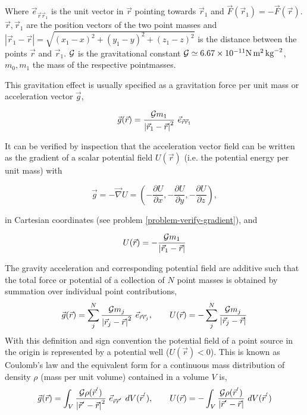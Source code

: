 Where ${\vec e}_{\vec{r}\vec{r}_1}$ is the unit vector in 
${\vec r}$ pointing towards ${\vec r}_1$
and ${\vec F}({\vec r}_1) = - {\vec F}({\vec r})$.
${\vec r}, {\vec r}_1$ 
are the position vectors of the two point masses
and 
$\left | {\vec r}_1 - {\vec r} \right | =
\sqrt{(x_1-x)^2 + (y_1-y)^2 + (z_1-z)^2}$
is the distance between the points ${\vec r}$ and ${\vec r}_1$.
${\cal G}$ is the gravitational constant 
${\cal G} \simeq 6.67 \times 10^{-11} \si{\newton\square\metre\per\square\kilo\gram}$,
$m_0, m_1$ the mass of the respective pointmasses.


This gravitation effect is usually specified as a gravitation force per 
unit mass or acceleration vector ${\vec g}$,
\begin{mdframed}[backgroundcolor=blue!5]
\begin{equation}
{\vec g}({\vec r}) =
\frac{{\cal G} m_1}{\left | {\vec r}_1 - {\vec r} \right | ^2} ~ {\vec e}_{\vec{r}\vec{r}_1} 
\label{grav_accel}
\end{equation}
\end{mdframed}
It can be verified by inspection that the acceleration vector field 
can be written as the 
gradient of a scalar potential field $U({\vec r})$ (i.e. the potential
energy per unit mass) with
\begin{mdframed}[backgroundcolor=blue!5]
\[
{\vec g} = - \vec\nabla U = 
(- \frac{\partial U}{\partial x}, 
 - \frac{\partial U}{\partial y}, 
 - \frac{\partial U}{\partial z}),\]
\end{mdframed}
in Cartesian coordinates (see problem \ref{problem-verify-gradient}),
and
\begin{mdframed}[backgroundcolor=blue!5]
\begin{equation}
U({\vec r}) = - \frac{{\cal G} m_1}{\left | {\vec r}_1 - {\vec r} \right |} 
\label{grav_potential}
\end{equation}
\end{mdframed}

The gravity acceleration and corresponding potential field are additive 
such that the total force or potential of a 
collection of $N$ point masses is obtained by summation over individual
point contributions,
\begin{equation}
{\vec g} ({\vec r}) = 
\sum_j^N \frac{{\cal G} m_j}{\left | {\vec r}_j - {\vec r} \right | ^2} ~ {\vec e}_{\vec{r}\vec{r}_j}
, 
\qquad
U({\vec r}) = 
- \sum_j^N \frac{{\cal G} m_j}{\left | {\vec r}_j - {\vec r} \right |}
\end{equation}
With this definition and sign convention the potential field of
a point source in the origin is represented by a
potential well ($U({\vec r}) < 0$).
This is known as Coulomb's law and the equivalent form for a continuous
mass distribution of density $\rho$ (mass per unit volume) contained in
a volume $V$ is,
\begin{equation}
{\vec g}({\vec r}) = 
\int_V \frac{{\cal G} \rho({\vec r}^{'})}
{\left | {\vec r}^{'} - {\vec r} \right | ^2} ~ 
{\vec e}_{\vec{r}\vec{r}^{'}} ~ dV({\vec r}^{'})
,
\qquad 
U({\vec r}) = 
- \int_V \frac{{\cal G} \rho({\vec r}^{'})}
                     {\left | {\vec r}^{'} - {\vec r} \right |} ~ 
dV({\vec r}^{'})
\label{Coulomb-integrals}
\end{equation}

